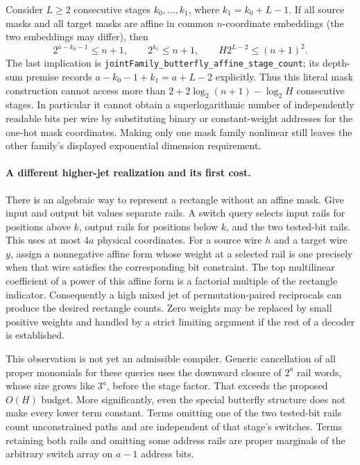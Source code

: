 \documentclass[11pt]{article}
\begin{document}
Consider $L\geq2$ consecutive stages $k_0,\ldots,k_1$, where
$k_1=k_0+L-1$. If all source masks and all target masks are affine in
common $n$-coordinate embeddings (the two embeddings may differ), then
\[
 2^{a-k_0-1}\leq n+1,\qquad 2^{k_1}\leq n+1,
 \qquad H2^{L-2}\leq(n+1)^2.                 \tag{1}
\]
The last implication is
\texttt{jointFamily\_butterfly\_affine\_stage\_count}; its depth-sum
premise records $a-k_0-1+k_1=a+L-2$ explicitly.
Thus this literal mask construction cannot access more than
$2+2\log_2(n+1)-\log_2 H$ consecutive stages. In particular it cannot
obtain a superlogarithmic number of independently readable bits per wire
by substituting binary or constant-weight addresses for the one-hot mask
coordinates. Making only one mask family nonlinear still leaves the
other family's displayed exponential dimension requirement.

\paragraph{A different higher-jet realization and its first cost.}
There is an algebraic way to represent a rectangle without an affine
mask. Give input and output bit values separate rails. A switch query
selects input rails for positions above $k$, output rails for positions
below $k$, and the two tested-bit rails. This uses at most $4a$ physical
coordinates. For a source wire $h$ and a target wire $y$, assign a
nonnegative affine form whose weight at a selected rail is one precisely
when that wire satisfies the corresponding bit constraint. The top
multilinear coefficient of a power of this affine form is a factorial
multiple of the rectangle indicator. Consequently a high mixed jet of
permutation-paired reciprocals can produce the desired rectangle counts.
Zero weights may be replaced by small positive weights and handled by a
strict limiting argument if the rest of a decoder is established.

This observation is not yet an admissible compiler. Generic cancellation
of all proper monomials for these queries uses the downward closure of
$2^a$ rail words, whose size grows like $3^a$, before the stage factor.
That exceeds the proposed $O(H)$ budget. More significantly, even the
special butterfly structure does not make every lower term constant.
Terms omitting one of the two tested-bit rails count unconstrained paths
and are independent of that stage's switches. Terms retaining both rails
and omitting some address rails are proper marginals of the arbitrary
switch array on $a-1$ address bits.
\end{document}
